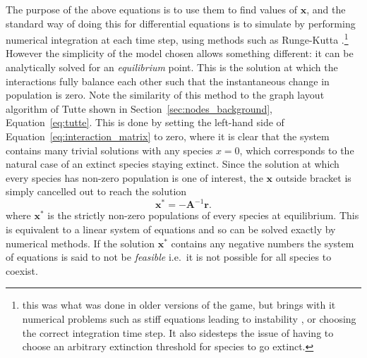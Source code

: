 The purpose of the above equations is to use them to find values of $\mathbf{x}$, and the standard way of doing this for differential equations is to simulate by performing numerical integration at each time step, using methods such as Runge-Kutta \cite{Press2007Runge}.\footnote{this was what was done in older versions of the game, but brings with it numerical problems such as stiff equations leading to instability \cite{Press2007Runge}, or choosing the correct integration time step. It also sidesteps the issue of having to choose an arbitrary extinction threshold for species to go extinct.}
However the simplicity of the model chosen allows something different: it can be analytically solved for an \emph{equilibrium} point. This is the solution at which the interactions fully balance each other such that the instantaneous change in population is zero. Note the similarity of this method to the graph layout algorithm of Tutte shown in Section~\ref{sec:nodes_background}, Equation~\eqref{eq:tutte}.
This is done by setting the left-hand side of Equation~\eqref{eq:interaction_matrix} to zero, where it is clear that the system contains many trivial solutions with any species $x=0$, which corresponds to the natural case of an extinct species staying extinct.
Since the solution at which every species has non-zero population is one of interest, the $\mathbf{x}$ outside bracket is simply cancelled out to reach the solution
\begin{equation}
  \mathbf{x^*} = -\mathbf{A}^{-1}\mathbf{r}.
  \label{eq:equilibrium}
\end{equation}
where $\mathbf{x}^*$ is the strictly non-zero populations of every species at equilibrium.
This is equivalent to a linear system of equations and so can be solved exactly by numerical methods.
If the solution $\mathbf{x^*}$ contains any negative numbers the system of equations is said to not be \emph{feasible} i.e.\ it is not possible for all species to coexist.

